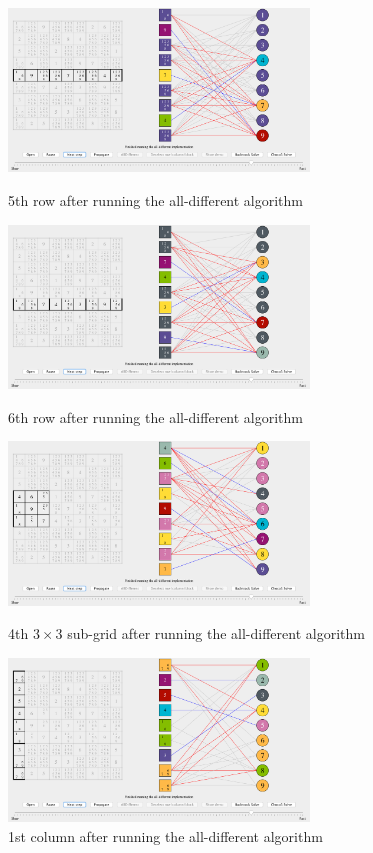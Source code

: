 \documentclass{l4proj}
\begin{document}
\begin{figure}[H]
\begin{minipage}{8.0cm}
\centering
\includegraphics[width=8cm]{images/proof_of_concept/screenshot3.png}
\caption{5th row after running the all-different algorithm}
\label{screenshot3}
\end{minipage}%
\hfill
\begin{minipage}{8.0cm}
\centering
\includegraphics[width=8cm]{images/proof_of_concept/screenshot4.png}
\caption{6th row after running the all-different algorithm}
\label{screenshot4}
\end{minipage}%
\vspace*{1cm}
\begin{minipage}{8.0cm}
\centering
\includegraphics[width=8cm]{images/proof_of_concept/screenshot5.png}
\caption{4th $3\times 3$ sub-grid after running the all-different algorithm}
\label{screenshot5}
\end{minipage}%
\hfill
\begin{minipage}{8.0cm}
\centering
\includegraphics[width=8cm]{images/proof_of_concept/screenshot6.png}
\caption{1st column after running the all-different algorithm}
\label{screenshot6}
\end{minipage}%
\end{figure}
\end{document}
